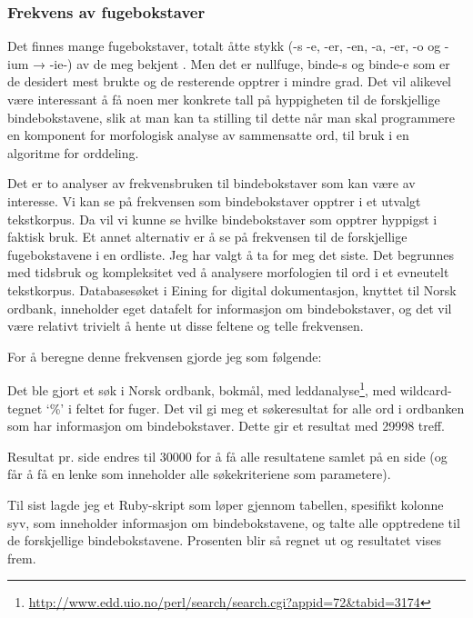 \subsubsection{Frekvens av fugebokstaver}
\label{sec:fuge-frekvens}

Det finnes mange fugebokstaver, totalt åtte stykk (-s -e, -er, -en, -a, -er, -o og -ium → -ie-)  av de meg bekjent \cite{faarlund1997norsk,bindebokstaver}. Men det er nullfuge, binde-s og binde-e som er de desidert mest brukte og de resterende opptrer i mindre grad. Det vil alikevel være interessant å få noen mer konkrete tall på hyppigheten til de forskjellige bindebokstavene, slik at man kan ta stilling til dette når man skal programmere en komponent for morfologisk analyse av sammensatte ord, til bruk i en algoritme for orddeling.

Det er to analyser av frekvensbruken til bindebokstaver som kan være av interesse. Vi kan se på frekvensen som bindebokstaver opptrer i et utvalgt tekstkorpus. Da vil vi kunne se hvilke bindebokstaver som opptrer hyppigst i faktisk bruk. Et annet alternativ er å se på frekvensen til de forskjellige fugebokstavene i en ordliste. Jeg har valgt å ta for meg det siste. Det begrunnes med tidsbruk og kompleksitet ved å analysere morfologien til ord i et evneutelt tekstkorpus. Databasesøket i Eining for digital dokumentasjon, knyttet til Norsk ordbank, inneholder eget datafelt for informasjon om bindebokstaver, og det vil være relativt trivielt å hente ut disse feltene og telle frekvensen. 

For å beregne denne frekvensen gjorde jeg som følgende:

\begin{items}
	\item Det ble gjort et søk i Norsk ordbank, bokmål, med leddanalyse\footnote{\url{http://www.edd.uio.no/perl/search/search.cgi?appid=72&tabid=3174}}, med wildcard-tegnet ‘\%’ i feltet for fuger. Det vil gi meg et søkeresultat for alle ord i ordbanken som har informasjon om bindebokstaver. Dette gir et resultat med 29998 treff.
	\item Resultat pr. side endres til 30000 for å få alle resultatene samlet på en side (og får å få en lenke som inneholder alle søkekriteriene som parametere).
	\item Til sist lagde jeg et Ruby-skript som løper gjennom tabellen, spesifikt kolonne syv, som inneholder informasjon om bindebokstavene, og talte alle opptredene til de forskjellige bindebokstavene. Prosenten blir så regnet ut og resultatet vises frem.
\end{items}

